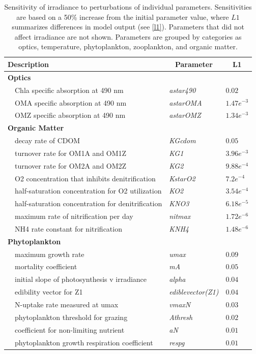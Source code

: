 \documentclass[review]{elsarticle}\usepackage[]{graphicx}\usepackage[]{color}
\begin{document}
\begin{table}[!tbp]
{\footnotesize
\caption{Sensitivity of irradiance to perturbations of individual parameters.  Sensitivities are based on a 50\% increase from the initial parameter value, where $L1$ summarizes differences in model output (see \cref{l1}).  Parameters that did not affect irradiance are not shown.  Parameters are grouped by categories as optics, temperature, phytoplankton, zooplankton, and organic matter.\label{tab:irrsens}} 
\begin{center}
\begin{tabular}{lll}
\hline\hline
\multicolumn{1}{l}{Description}&\multicolumn{1}{c}{Parameter}&\multicolumn{1}{c}{L1}\tabularnewline
\hline
{\bfseries Optics}&&\tabularnewline
~~Chla specific absorption at 490 nm&\textit{astar490}&$0.02$\tabularnewline
~~OMA specific absorption at 490 nm&\textit{astarOMA}&$1.47e^{-3}$\tabularnewline
~~OMZ specific absorption at 490 nm&\textit{astarOMZ}&$1.34e^{-3}$\tabularnewline
\hline
{\bfseries Organic Matter}&&\tabularnewline
~~decay rate of CDOM&\textit{KGcdom}&$0.05$\tabularnewline
~~turnover rate for OM1A and OM1Z&\textit{KG1}&$3.96e^{-3}$\tabularnewline
~~turnover rate for OM2A and OM2Z&\textit{KG2}&$9.88e^{-4}$\tabularnewline
~~O2 concentration that inhibits denitrification&\textit{KstarO2}&$7.2e^{-4}$\tabularnewline
~~half-saturation concentration for O2 utilization&\textit{KO2}&$3.54e^{-4}$\tabularnewline
~~half-saturation concentration for denitrification&\textit{KNO3}&$6.18e^{-5}$\tabularnewline
~~maximum rate of nitrification per day&\textit{nitmax}&$1.72e^{-6}$\tabularnewline
~~NH4 rate constant for nitrification&\textit{KNH4}&$1.48e^{-6}$\tabularnewline
\hline
{\bfseries Phytoplankton}&&\tabularnewline
~~maximum growth rate&\textit{umax}&$0.09$\tabularnewline
~~mortality coefficient&\textit{mA}&$0.05$\tabularnewline
~~initial slope of photosynthesis v irradiance&\textit{alpha}&$0.04$\tabularnewline
~~edibility vector for Z1&\textit{ediblevector(Z1)}&$0.04$\tabularnewline
~~N-uptake rate measured at umax&\textit{vmaxN}&$0.03$\tabularnewline
~~phytoplankton threshold for grazing&\textit{Athresh}&$0.02$\tabularnewline
~~coefficient for non-limiting nutrient&\textit{aN}&$0.01$\tabularnewline
~~phytoplankton growth respiration coefficient&\textit{respg}&$0.01$\tabularnewline

\end{tabular}
\end{center}}
\end{table}
\end{document}

